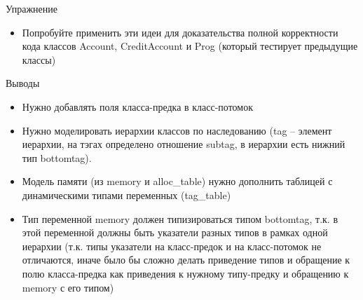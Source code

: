 \documentclass[hyperref={unicode=true}]{beamer}
\begin{document}
    \begin{frame}{Упражнение}
    \begin{itemize}
    \item
    Попробуйте применить эти идеи для доказательства
    полной корректности кода классов Account, CreditAccount
    и Prog (который тестирует предыдущие классы)
    \end{itemize}
    \end{frame}

    \begin{frame}{Выводы}
    \begin{itemize}
    \item
    Нужно добавлять поля класса-предка в класс-потомок
    \item
    Нужно моделировать иерархии классов по наследованию
    (tag -- элемент иерархии, на тэгах определено отношение
    subtag, в иерархии есть нижний тип bottomtag).
    \item
    Модель памяти (из memory и alloc\_table) нужно
    дополнить таблицей с динамическими типами переменных
    (tag\_table)
    \item
    Тип переменной memory должен типизироваться типом bottomtag,
    т.к. в этой переменной должны быть указатели разных
    типов в рамках одной иерархии (т.к. типы указатели на класс-предок
    и на класс-потомок не отличаются, иначе было бы сложно
    делать приведение типов и обращение к полю класса-предка как
    приведения к нужному типу-предку и обращению к memory с его типом)
    \end{itemize}
    \end{frame}
\end{document}
